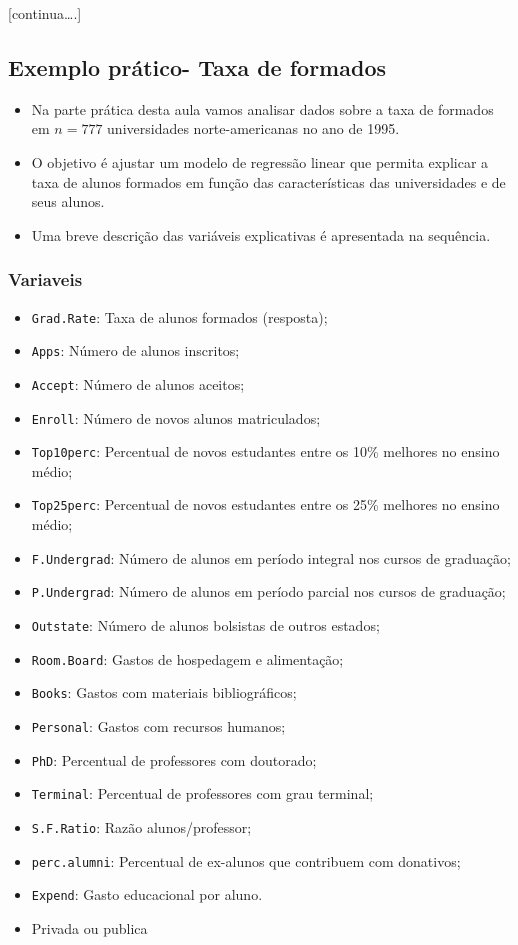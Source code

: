 \documentclass[
]{article}
\providecommand{\tightlist}{%
  \setlength{\itemsep}{0pt}\setlength{\parskip}{0pt}}
\begin{document}
{[}continua\ldots.{]}

\subsection{Exemplo prático- Taxa de
formados}\label{exemplo-pruxe1tico--taxa-de-formados}

\begin{itemize}
\tightlist
\item
  Na parte prática desta aula vamos analisar dados sobre a taxa de
  formados em \(n=777\) universidades norte-americanas no ano de 1995.
\item
  O objetivo é ajustar um modelo de regressão linear que permita
  explicar a taxa de alunos formados em função das características das
  universidades e de seus alunos.
\item
  Uma breve descrição das variáveis explicativas é apresentada na
  sequência.
\end{itemize}

\subsubsection{Variaveis}\label{variaveis}

\begin{itemize}
\tightlist
\item
  \texttt{Grad.Rate}: Taxa de alunos formados (resposta);
\item
  \texttt{Apps}: Número de alunos inscritos;
\item
  \texttt{Accept}: Número de alunos aceitos;
\item
  \texttt{Enroll}: Número de novos alunos matriculados;
\item
  \texttt{Top10perc}: Percentual de novos estudantes entre os 10\%
  melhores no ensino médio;
\item
  \texttt{Top25perc}: Percentual de novos estudantes entre os 25\%
  melhores no ensino médio;
\item
  \texttt{F.Undergrad}: Número de alunos em período integral nos cursos
  de graduação;
\item
  \texttt{P.Undergrad}: Número de alunos em período parcial nos cursos
  de graduação;
\item
  \texttt{Outstate}: Número de alunos bolsistas de outros estados;
\item
  \texttt{Room.Board}: Gastos de hospedagem e alimentação;
\item
  \texttt{Books}: Gastos com materiais bibliográficos;
\item
  \texttt{Personal}: Gastos com recursos humanos;
\item
  \texttt{PhD}: Percentual de professores com doutorado;
\item
  \texttt{Terminal}: Percentual de professores com grau terminal;
\item
  \texttt{S.F.Ratio}: Razão alunos/professor;
\item
  \texttt{perc.alumni}: Percentual de ex-alunos que contribuem com
  donativos;
\item
  \texttt{Expend}: Gasto educacional por aluno.
\item
  Privada ou publica
\end{itemize}
\end{document}

